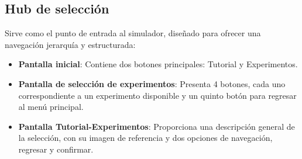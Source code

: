 \subsection{Hub de selección}
Sirve como el punto de entrada al simulador, diseñado para ofrecer una navegación jerarquía y estructurada:
\begin{itemize}
    \item \textbf{Pantalla inicial}: Contiene dos botones principales: Tutorial y Experimentos.
    \item \textbf{Pantalla de selección de experimentos}: Presenta 4 botones, cada uno correspondiente a un experimento disponible y un quinto botón para regresar al menú principal.
    \item \textbf{Pantalla Tutorial-Experimentos}: Proporciona una descripción general de la selección, con su imagen de referencia y dos opciones de navegación, regresar y confirmar.
\end{itemize}
